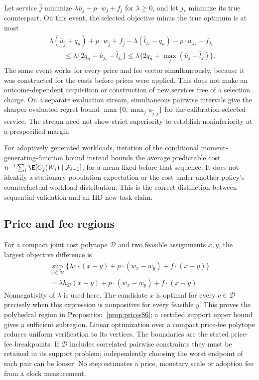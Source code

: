 Let service $\widehat j$ minimize $\lambda\bar u_j+p\cdot w_j+f_j$ for $\lambda\ge0$, and let $j_*$ minimize its true counterpart. On this event, the selected objective minus the true optimum is at most
\begin{align*}
 &\lambda(\bar u_{\widehat j}+q_n)+p\cdot w_{\widehat j}+f_{\widehat j}
 -\lambda(\bar l_{j_*}-q_n)-p\cdot w_{j_*}-f_{j_*}\\
 &\hspace{25pt}\le\lambda\{2q_n+\bar u_{j_*}-\bar l_{j_*}\}
 \le\lambda\{2q_n+\max_j(\bar u_j-\bar l_j)\}.
\end{align*}
The same event works for every price and fee vector simultaneously, because it was constructed for the costs before prices were applied. This does not make an outcome-dependent acquisition or construction of new services free of a selection charge. On a separate evaluation stream, simultaneous pairwise intervals give the sharper evaluated regret bound $\max\{0,\max_j u_{\widehat j,j}\}$ for the calibration-selected service. The stream need not show strict superiority to establish noninferiority at a prespecified margin.

For adaptively generated workloads, iteration of the conditional moment-generating-function bound instead bounds the average predictable cost $n^{-1}\sum_i\E[C_j(W_i)\mid\mathcal F_{i-1}]$, for a menu fixed before that sequence. It does not identify a stationary population expectation or the cost under another policy's counterfactual workload distribution. This is the correct distinction between sequential validation and an IID new-task claim.

\subsection{Price and fee regions}
For a compact joint cost polytope $\mathcal D$ and two feasible assignments $x,y$, the largest objective difference is
\begin{multline*}
 \sup_{c\in\mathcal D}\{\lambda c\cdot(x-y)+p\cdot(w_x-w_y)+f\cdot(x-y)\}\\
 =\lambda h_{\mathcal D}(x-y)+p\cdot(w_x-w_y)+f\cdot(x-y).
\end{multline*}
Nonnegativity of $\lambda$ is used here. The candidate $x$ is optimal for every $c\in\mathcal D$ precisely when this expression is nonpositive for every feasible $y$. This proves the polyhedral region in Proposition~\ref{prop:prices86}; a certified support upper bound gives a sufficient subregion. Linear optimization over a compact price-fee polytope reduces uniform verification to its vertices. The boundaries are the stated price-fee breakpoints. If $\mathcal D$ includes correlated pairwise constraints they must be retained in its support problem; independently choosing the worst endpoint of each pair can be looser. No step estimates a price, monetary scale or adoption fee from a clock measurement.

